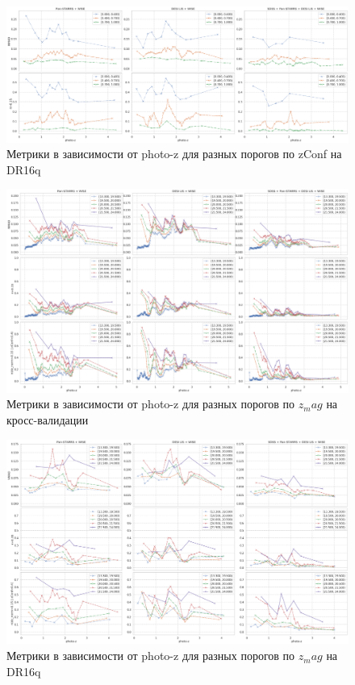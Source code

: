 \documentclass[fleqn,usenatbib]{mnras}
\begin{document}
\begin{landscape}
\begin{figure}
    \centering
    \includegraphics[width=0.9\linewidth]{images/metrics-adv-photoz-x-zconf-dr16q.png}
    \caption{Метрики в зависимости от photo-z для разных порогов по zConf на DR16q}
    \label{fig:my_label}
\end{figure}
\end{landscape}


\begin{landscape}
\begin{figure}
    \centering
    \includegraphics[width=0.9\linewidth]{images/metrics-adv-photoz-x-zmag-cv2.png}
    \caption{Метрики в зависимости от photo-z для разных порогов по $z_mag$ на кросс-валидации}
    \label{fig:my_label}
\end{figure}
\end{landscape}


\begin{landscape}
\begin{figure}
    \centering
    \includegraphics[width=0.9\linewidth]{images/metrics-adv-photoz-x-zmag-dr16q.png}
    \caption{Метрики в зависимости от photo-z для разных порогов по $z_mag$ на DR16q}
    \label{fig:my_label}
\end{figure}
\end{landscape}
\end{document}
